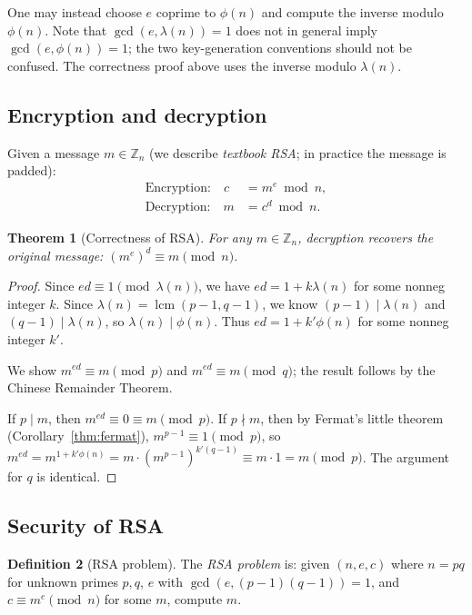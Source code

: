 \documentclass[twoside,12pt]{book}
\theoremstyle{plain}
\newtheorem{theorem}{Theorem}[chapter]
\theoremstyle{definition}
\newtheorem{definition}[theorem]{Definition}
\theoremstyle{remark}
\begin{document}
One may instead choose $e$ coprime to $\phi(n)$ and compute the inverse
modulo $\phi(n)$. Note that $\gcd(e,\lambda(n))=1$ does not in general imply
$\gcd(e,\phi(n))=1$; the two key-generation conventions should not be
confused. The correctness proof above uses the inverse modulo $\lambda(n)$.

\subsection{Encryption and decryption}

Given a message $m \in \mathbb{Z}_n$ (we describe \emph{textbook RSA}; in practice the message is padded):
\begin{align*}
\text{Encryption:} \quad c &= m^e \bmod n, \\
\text{Decryption:} \quad m &= c^d \bmod n.
\end{align*}

\begin{theorem}[Correctness of RSA]
\label{thm:rsa-correctness}
For any $m \in \mathbb{Z}_n$, decryption recovers the original message: $(m^e)^d \equiv m \pmod{n}$.
\end{theorem}

\begin{proof}
Since $ed \equiv 1 \pmod{\lambda(n)}$, we have $ed = 1 + k\lambda(n)$ for some nonneg integer $k$. Since $\lambda(n) = \operatorname{lcm}(p-1, q-1)$, we know $(p-1) \mid \lambda(n)$ and $(q-1) \mid \lambda(n)$, so $\lambda(n) \mid \phi(n)$. Thus $ed = 1 + k'\phi(n)$ for some nonneg integer $k'$.

We show $m^{ed} \equiv m \pmod{p}$ and $m^{ed} \equiv m \pmod{q}$; the result follows by the Chinese Remainder Theorem.

If $p \mid m$, then $m^{ed} \equiv 0 \equiv m \pmod{p}$. If $p \nmid m$, then by Fermat's little theorem (Corollary~\ref{thm:fermat}), $m^{p-1} \equiv 1 \pmod{p}$, so $m^{ed} = m^{1+k'\phi(n)} = m \cdot (m^{p-1})^{k'(q-1)} \equiv m \cdot 1 = m \pmod{p}$. The argument for $q$ is identical.
\end{proof}

\subsection{Security of RSA}

\begin{definition}[RSA problem]
The \emph{RSA problem} is: given $(n, e, c)$ where $n = pq$ for unknown primes $p, q$, $e$ with $\gcd(e, (p-1)(q-1)) = 1$, and $c \equiv m^e \pmod{n}$ for some $m$, compute $m$.
\end{definition}
\end{document}
